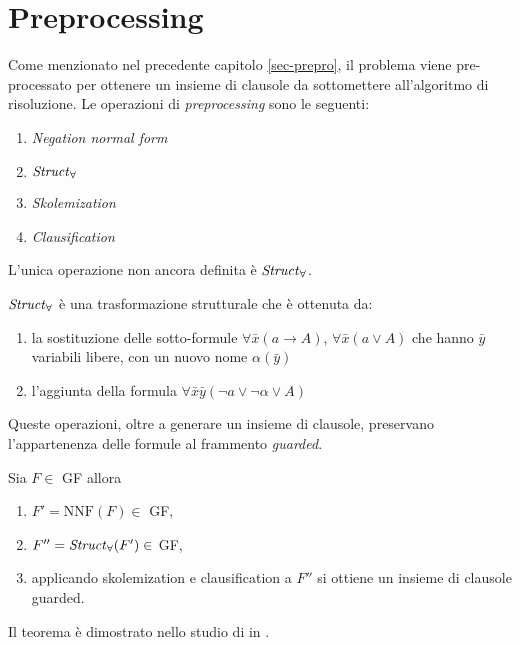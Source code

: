 \section{Preprocessing}
Come menzionato nel precedente capitolo \ref{sec-prepro}, il problema viene pre-processato per ottenere un insieme di clausole 
da sottomettere all'algoritmo di risoluzione. Le operazioni di \emph{preprocessing} sono le seguenti:
\begin{enumerate}
    \item \emph{Negation normal form} 
    \item $\text{\emph{Struct}}_\forall$
    \item \emph{Skolemization}
    \item \emph{Clausification}
\end{enumerate} 
L'unica operazione non ancora definita è $\text{\emph{Struct}}_\forall$.
\begin{definition}\label{struct-def}
    $\text{\emph{Struct}}_\forall$ è una trasformazione strutturale che è ottenuta da:
    \begin{enumerate}
        \item la sostituzione delle sotto-formule $\forall\bar{x}(a \rightarrow A)$, $\forall\bar{x}(a \lor A)$ che hanno 
        $\bar{y}$ variabili libere, con un nuovo nome $\alpha(\bar{y})$
        \item l'aggiunta della formula $\forall\bar{x}\bar{y}(\lnot a \lor \lnot\alpha \lor A)$
    \end{enumerate}
\end{definition}
Queste operazioni, oltre a generare un insieme di clausole, preservano l'appartenenza delle formule al frammento \emph{guarded}.
\begin{theorem}
    Sia $F\in$ GF allora 
    \begin{enumerate}
        \item $F'=\text{NNF}(F) \in$ GF,
        \item $F''=\text{\emph{Struct}}_\forall(F') \in$ GF,
        \item applicando skolemization e clausification a $F''$ si ottiene un insieme di clausole guarded.
    \end{enumerate}
\end{theorem}
Il teorema è dimostrato nello studio di \citeauthor{de2003deciding} in \cite{de2003deciding}.
